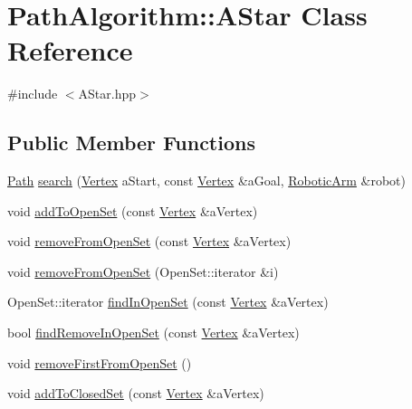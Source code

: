 \hypertarget{class_path_algorithm_1_1_a_star}{}\section{Path\+Algorithm\+:\+:A\+Star Class Reference}
\label{class_path_algorithm_1_1_a_star}


{\ttfamily \#include $<$A\+Star.\+hpp$>$}

\subsection*{Public Member Functions}
\begin{DoxyCompactItemize}
\item 
\hyperlink{namespace_path_algorithm_a7f2958a43117506f3cb6dc9409a22c0d}{Path} \hyperlink{class_path_algorithm_1_1_a_star_a09778c7ec09ee48c3a8088402a653cca}{search} (\hyperlink{struct_path_algorithm_1_1_vertex}{Vertex} a\+Start, const \hyperlink{struct_path_algorithm_1_1_vertex}{Vertex} \&a\+Goal, \hyperlink{class_robotic_arm}{Robotic\+Arm} \&robot)
\item 
void \hyperlink{class_path_algorithm_1_1_a_star_a63f88f24acf7bf34cd060051134c9190}{add\+To\+Open\+Set} (const \hyperlink{struct_path_algorithm_1_1_vertex}{Vertex} \&a\+Vertex)
\item 
void \hyperlink{class_path_algorithm_1_1_a_star_afcc23a676145d6e280d1c3430af5380a}{remove\+From\+Open\+Set} (const \hyperlink{struct_path_algorithm_1_1_vertex}{Vertex} \&a\+Vertex)
\item 
void \hyperlink{class_path_algorithm_1_1_a_star_aba29c2585fbf49880cf5e8b9bf6d3eb5}{remove\+From\+Open\+Set} (Open\+Set\+::iterator \&i)
\item 
Open\+Set\+::iterator \hyperlink{class_path_algorithm_1_1_a_star_ae78bfebdee31135fdfb2f302347f962f}{find\+In\+Open\+Set} (const \hyperlink{struct_path_algorithm_1_1_vertex}{Vertex} \&a\+Vertex)
\item 
bool \hyperlink{class_path_algorithm_1_1_a_star_a657aaaf577ca25e68e6a5af57214e7d4}{find\+Remove\+In\+Open\+Set} (const \hyperlink{struct_path_algorithm_1_1_vertex}{Vertex} \&a\+Vertex)
\item 
void \hyperlink{class_path_algorithm_1_1_a_star_a5bb18edbbd54833aac9eddfe63ba652d}{remove\+First\+From\+Open\+Set} ()
\item 
void \hyperlink{class_path_algorithm_1_1_a_star_a53139e4b3cd3971a2bf85a430e83378f}{add\+To\+Closed\+Set} (const \hyperlink{struct_path_algorithm_1_1_vertex}{Vertex} \&a\+Vertex)

\end{DoxyCompactItemize}
